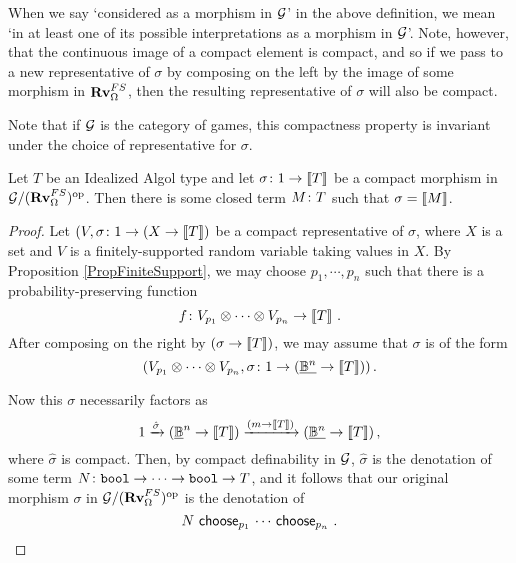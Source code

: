 \begin{remark}
  When we say `considered as a morphism in $\G$' in the above definition, we mean `in at least one of its possible interpretations as a morphism in $\G$'.  
  Note, however, that the continuous image of a compact element is compact, and so if we pass to a new representative of $\sigma$ by composing on the left by the image of some morphism in $\Rv_{\Omega}^{FS}$, then the resulting representative of $\sigma$ will also be compact.

  Note that if $\G$ is the category of games, this compactness property is invariant under the choice of representative for $\sigma$.
\end{remark}

\begin{proposition}
  Let $T$ be an Idealized Algol type and let $\sigma \from 1 \to \deno{T}$ be a compact morphism in $\G/\oppcat{(\Rv_{\Omega}^{FS})}$.  
  Then there is some closed term $M\from T$ such that $\sigma = \deno{M}$.
  \label{PropProbabilityCompactDefinability}
\end{proposition}
\begin{proof}
  Let $(V, \sigma \from 1 \to (X \to \deno{T})$ be a compact representative of $\sigma$, where $X$ is a set and $V$ is a finitely-supported random variable taking values in $X$.  
  By Proposition \ref{PropFiniteSupport}, we may choose $p_1,\cdots,p_n$ such that there is a probability-preserving function
  \[
    f \from V_{p_1} \tensor \cdots \tensor V_{p_n} \to \deno{T}\,.
    \]
  After composing on the right by $(\sigma \to \deno{T})$, we may assume that $\sigma$ is of the form
  \[
    (V_{p_1}\tensor\cdots\tensor V_{p_n}, \sigma \from 1 \to (\ul{\bB^n} \to \deno{T}))\,.
    \]

  Now this $\sigma$ necessarily factors as
  \[
    1 \xrightarrow{\hat{\sigma}}
    (\ul{\bB}^n \to \deno T) \xrightarrow{(m \to \deno T)}
    (\ul{\bB^n} \to \deno T)\,,
    \]
  where $\hat{\sigma}$ is compact.  
  Then, by compact definability in $\G$, $\hat\sigma$ is the denotation of some term $N \from \bool \to \cdots \to \bool \to T$, and it follows that our original morphism $\sigma$ in $\G/\oppcat{(\Rv_{\Omega}^{FS})}$ is the denotation of
  \[
    N\,\choose_{p_1}\,\cdots\,\choose_{p_n}\,.\qedhere
    \]
\end{proof}

